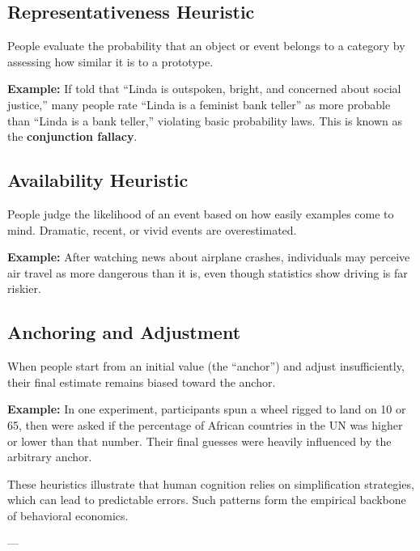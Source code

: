 \documentclass[11pt]{book}
\begin{document}
\subsection*{Representativeness Heuristic}
People evaluate the probability that an object or event belongs to a category by assessing how similar it is to a prototype.

\begin{examplebox}
\textbf{Example:} If told that ``Linda is outspoken, bright, and concerned about social justice,'' many people rate ``Linda is a feminist bank teller'' as more probable than ``Linda is a bank teller,'' violating basic probability laws. This is known as the \textbf{conjunction fallacy}.
\end{examplebox}

\subsection*{Availability Heuristic}
People judge the likelihood of an event based on how easily examples come to mind. Dramatic, recent, or vivid events are overestimated.

\begin{examplebox}
\textbf{Example:} After watching news about airplane crashes, individuals may perceive air travel as more dangerous than it is, even though statistics show driving is far riskier.
\end{examplebox}

\subsection*{Anchoring and Adjustment}
When people start from an initial value (the ``anchor'') and adjust insufficiently, their final estimate remains biased toward the anchor.

\begin{examplebox}
\textbf{Example:} In one experiment, participants spun a wheel rigged to land on 10 or 65, then were asked if the percentage of African countries in the UN was higher or lower than that number. Their final guesses were heavily influenced by the arbitrary anchor.
\end{examplebox}

These heuristics illustrate that human cognition relies on simplification strategies, which can lead to predictable errors. Such patterns form the empirical backbone of behavioral economics.

---
\end{document}
